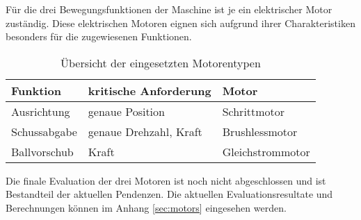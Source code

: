 Für die drei Bewegungsfunktionen der Maschine ist je ein elektrischer
Motor zuständig. Diese elektrischen Motoren eignen sich aufgrund ihrer
Charakteristiken besonders für die zugewiesenen Funktionen. 

\begin{table}[h!]
	\centering
	\begin{tabular}{l l l}
		Funktion & kritische Anforderung & Motor \\
		\hline
		Ausrichtung
			& genaue Position
			& Schrittmotor \\
		Schussabgabe
			& genaue Drehzahl, Kraft
			& Brushlessmotor \\
		Ballvorschub
			& Kraft
			& Gleichstrommotor \\
	\end{tabular}
	\caption{Übersicht der eingesetzten Motorentypen}
\end{table}

Die finale Evaluation der drei Motoren ist noch nicht abgeschlossen
und ist Bestandteil der aktuellen Pendenzen. Die aktuellen
Evaluationsresultate und Berechnungen können im Anhang \ref{sec:motors}
eingesehen werden.
